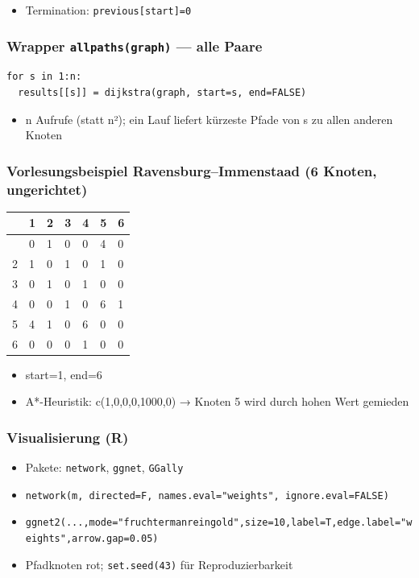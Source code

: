 \documentclass[11pt, a4paper]{article}
\begin{document}
\begin{itemize}
  \item Termination: \texttt{previous[start]=0}
\end{itemize}


\subsubsection{Wrapper \texttt{allpaths(graph)} — alle Paare}
\begin{lstlisting}
for s in 1:n:
  results[[s]] = dijkstra(graph, start=s, end=FALSE)
\end{lstlisting}

\begin{itemize}
  \item n Aufrufe (statt n²); ein Lauf liefert kürzeste Pfade von s zu allen anderen Knoten
\end{itemize}


\subsubsection{Vorlesungsbeispiel Ravensburg–Immenstaad (6 Knoten, ungerichtet)}


{\footnotesize
\begin{tabularx}{\linewidth}{XXXXXXX}
\hline
\rowcolor{tableheadbg}
{\color{white}\textbf{}} & {\color{white}\textbf{1}} & {\color{white}\textbf{2}} & {\color{white}\textbf{3}} & {\color{white}\textbf{4}} & {\color{white}\textbf{5}} & {\color{white}\textbf{6}} \\[2pt]
\hline
\endhead
\hline
\endfoot
1 & 0 & 1 & 0 & 0 & 4 & 0 \\
2 & 1 & 0 & 1 & 0 & 1 & 0 \\
3 & 0 & 1 & 0 & 1 & 0 & 0 \\
4 & 0 & 0 & 1 & 0 & 6 & 1 \\
5 & 4 & 1 & 0 & 6 & 0 & 0 \\
6 & 0 & 0 & 0 & 1 & 0 & 0 \\
\end{tabularx}
}


\begin{itemize}
  \item start=1, end=6
  \item A*-Heuristik: c(1,0,0,0,1000,0) → Knoten 5 wird durch hohen Wert gemieden
\end{itemize}


\subsubsection{Visualisierung (R)}
\begin{itemize}
  \item Pakete: \texttt{network}, \texttt{ggnet}, \texttt{GGally}
  \item \texttt{network(m, directed=F, names.eval="weights", ignore.eval=FALSE)}
  \item \texttt{ggnet2(...,mode="fruchtermanreingold",size=10,label=T,edge.label="weights",arrow.gap=0.05)}
  \item Pfadknoten rot; \texttt{set.seed(43)} für Reproduzierbarkeit
\end{itemize}
\end{document}
